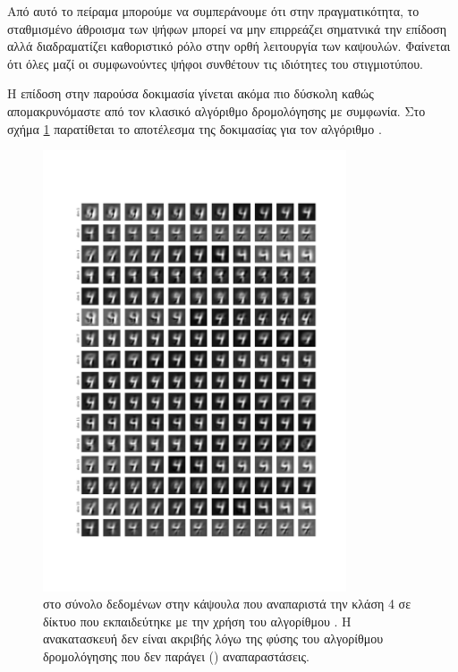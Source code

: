 Από αυτό το πείραμα μπορούμε να συμπεράνουμε ότι στην πραγματικότητα, το σταθμισμένο άθροισμα των ψήφων μπορεί να μην επιρρεάζει σηματνικά την επίδοση αλλά διαδραματίζει καθοριστικό ρόλο στην ορθή λειτουργία των καψουλών. Φαίνεται ότι όλες μαζί οι συμφωνούντες ψήφοι συνθέτουν τις ιδιότητες του στιγμιοτύπου.\par

Η επίδοση στην παρούσα δοκιμασία γίνεται ακόμα πιο δύσκολη καθώς απομακρυνόμαστε από τον κλασικό αλγόριθμο δρομολόγησης με συμφωνία. Στο σχήμα \ref{fig:exp_method_1_special_perturb_3} παρατίθεται το αποτέλεσμα της δοκιμασίας για τον αλγόριθμο .\par

\begin{figure}[h]
    \centering
    \includegraphics[width=0.8\textwidth]{images/chapter experiments/method 1/image 8/perturbations_19.png}
    \caption{ στο σύνολο δεδομένων  στην κάψουλα  που αναπαριστά την κλάση 4 σε δίκτυο που εκπαιδεύτηκε με την χρήση του αλγορίθμου . Η ανακατασκευή δεν είναι ακριβής λόγω της φύσης του αλγορίθμου δρομολόγησης που δεν παράγει  () αναπαραστάσεις.}
    \label{fig:exp_method_1_special_perturb_3}
  \end{figure}

